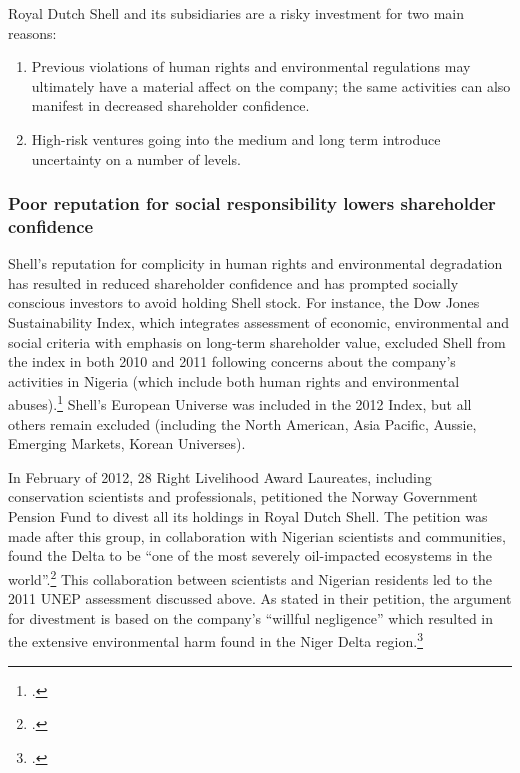 \documentclass[10pt]{article}
\begin{document}
Royal Dutch Shell and its subsidiaries are a risky investment for two main reasons:
\begin{enumerate}
	\item Previous violations of human rights and environmental regulations may ultimately have a material affect on the company; the same activities can also manifest in decreased shareholder confidence.
	\item High-risk ventures going into the medium and long term introduce uncertainty on a number of levels.
\end{enumerate}

	
	
	\subsubsection{Poor reputation for social responsibility lowers shareholder confidence}
	

	
Shell's reputation for complicity in human rights and environmental degradation has resulted in reduced shareholder confidence and has prompted socially conscious investors to avoid holding Shell stock.
For instance, the Dow Jones Sustainability Index, which integrates assessment of economic, environmental and social criteria with emphasis on long-term shareholder value, excluded Shell from the index in both 2010 and 2011 following concerns about the company's activities in Nigeria (which include both human rights and environmental abuses).\footcite{ShellIndex}
Shell's European Universe was included in the 2012 Index, but all others remain excluded (including the North American, Asia Pacific, Aussie, Emerging Markets, Korean Universes).



In February of 2012, 28 Right Livelihood Award Laureates, including conservation scientists and professionals, petitioned the Norway Government Pension Fund to divest all its holdings in Royal Dutch Shell. 
The petition was made after this group, in collaboration with Nigerian scientists and communities, found the Delta to be ``one of the most severely oil-impacted ecosystems in the world''.\footcite[][]{NigerDeltaReport_2006}
This collaboration between scientists and Nigerian residents led to the 2011 UNEP assessment discussed above.
As stated in their petition, the argument for divestment is based on the company's ``willful negligence'' which resulted in the extensive environmental harm found in the Niger Delta region.\footcite[][]{NorwayPetition_2012}
\end{document}
